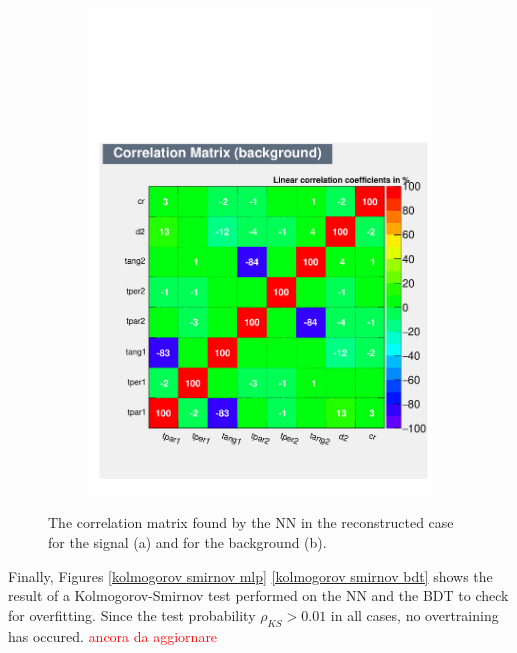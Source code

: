 \documentclass[10pt,a4paper]{book}
\newcommand\todo[1]{\textcolor{red}{#1}}
\begin{document}
\begin{figure}[h]
\begin{subfigure}{1.0\textwidth}
\includegraphics[scale=0.55]{reco/CorrelationMatrixB.pdf}
\caption{}
\end{subfigure}
\caption{The correlation matrix found by the NN in the reconstructed case for the signal (a) and for the background (b).}
\label{correlation reco}
\end{figure} 

Finally, Figures \ref{kolmogorov smirnov mlp} \ref{kolmogorov smirnov bdt} shows the result of a Kolmogorov-Smirnov test \cite{10.2307/2280095} performed on the NN and the BDT to check for overfitting. Since the test probability $\rho_{KS} > 0.01$ in all cases, no overtraining has occured. \todo{ancora da aggiornare}
\end{document}
